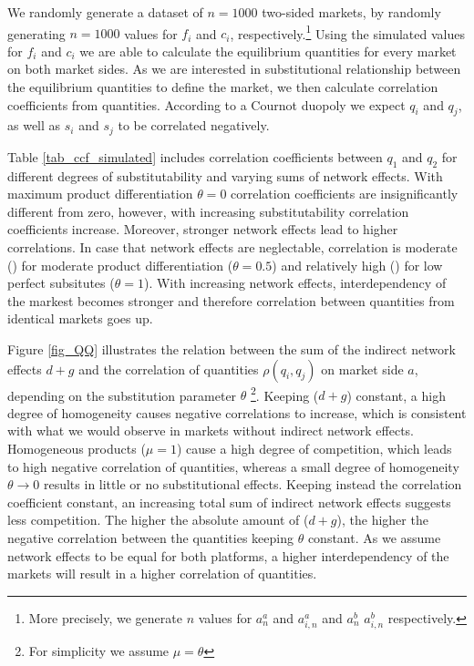 \documentclass[12pt,a4paper]{scrreprt}
\begin{document}
We randomly generate a dataset of $n=1000$ two-sided markets, by randomly generating $n=1000$ values for $f_i$ and $c_i$, respectively.\footnote{More precisely, we generate $n$ values for $a^a_n$ and $a^a_{i,n}$ and $a^b_n$ $a^b_{i,n}$ respectively.} Using the simulated values for $f_i$ and $c_i$ we are able to calculate the equilibrium quantities for every market on both market sides. As we are interested in substitutional relationship between the equilibrium quantities to define the market, we then calculate correlation coefficients from quantities. According to a Cournot duopoly we expect $q_i$ and $q_j$, as well as $s_i$ and $s_j$ to be correlated negatively. 

Table \ref{tab_ccf_simulated} includes correlation coefficients between $q_1$ and $q_2$ for different degrees of substitutability and varying sums of network effects. With maximum product differentiation $\theta=0$ correlation coefficients are insignificantly different from zero, however, with increasing substitutability correlation coefficients increase. Moreover, stronger network effects lead to higher correlations. In case that network effects are neglectable, correlation is moderate () for moderate product differentiation ($\theta=0.5$) and relatively high () for low perfect subsitutes ($\theta=1$). With increasing network effects, interdependency of the markest becomes stronger and therefore correlation between quantities from identical markets goes up. 

Figure \ref{fig_QQ} illustrates the relation between the sum of the indirect network effects $d+g$ and the correlation of quantities $\rho(q_i,q_j)$ on market side $a$, depending on the substitution parameter $\theta$ \footnote{For simplicity we assume $\mu=\theta$}. Keeping ($d+g$) constant, a high degree of homogeneity causes negative correlations to increase, which is consistent with what we would observe in markets without indirect network effects. Homogeneous products ($\mu=1$) cause a high degree of competition, which leads to high negative correlation of quantities, whereas a small degree of homogeneity $\theta \to 0$ results in little or no substitutional effects. Keeping instead the correlation coefficient constant, an increasing total sum of indirect network effects suggests less competition. The higher the absolute amount of ($d+g$), the higher the negative correlation between the quantities keeping $\theta$ constant. As we assume network effects to be equal for both platforms, a higher interdependency of the markets will result in a higher correlation of quantities. 
\end{document}
